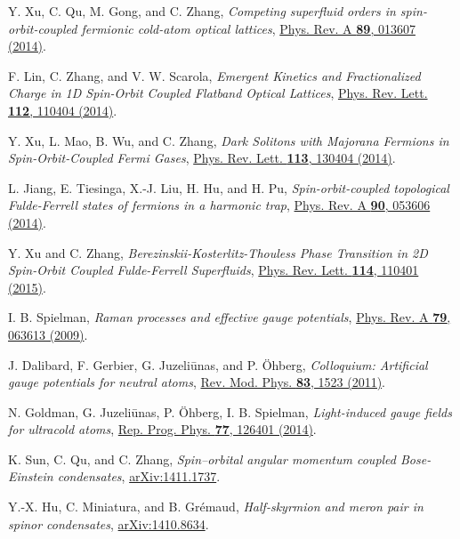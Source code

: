 \documentclass[twocolumn,pra,unsortedaddress,showpacs,floatfix,citeautoscript,nofootinbib]{revtex4-1}
\begin{document}
\begin{thebibliography}{99}
Y. Xu, C. Qu, M. Gong, and C. Zhang, \emph{Competing superfluid orders in spin-orbit-coupled fermionic cold-atom optical
lattices},
\href{http://dx.doi.org/10.1103/PhysRevA.89.013607}{Phys. Rev. A
\textbf{89}, 013607 (2014)}.

 F. Lin, C. Zhang, and V. W. Scarola, \emph{Emergent Kinetics and Fractionalized Charge in 1D Spin-Orbit Coupled Flatband Optical
Lattices},
\href{http://dx.doi.org/10.1103/PhysRevLett.112.110404}{Phys. Rev.
Lett. \textbf{112}, 110404 (2014)}.

Y. Xu, L. Mao, B. Wu, and C. Zhang, \emph{Dark Solitons with Majorana Fermions in Spin-Orbit-Coupled Fermi
Gases},
\href{http://dx.doi.org/10.1103/PhysRevLett.113.130404}{Phys. Rev.
Lett. \textbf{113}, 130404 (2014)}.

L. Jiang, E. Tiesinga, X.-J. Liu, H. Hu, and H.
Pu, \emph{Spin-orbit-coupled topological Fulde-Ferrell states of
fermions in a harmonic trap},
\href{http://dx.doi.org/10.1103/PhysRevA.90.053606}{Phys. Rev. A
\textbf{90}, 053606 (2014)}.

Y. Xu and C. Zhang, \emph{Berezinskii-Kosterlitz-Thouless Phase Transition in 2D Spin-Orbit Coupled Fulde-Ferrell
Superfluids},
\href{http://dx.doi.org/10.1103/PhysRevLett.114.110401}{Phys. Rev.
Lett. \textbf{114}, 110401 (2015)}.


 I. B. Spielman, \emph{Raman processes and effective gauge potentials}, \href{http://dx.doi.org/10.1103/PhysRevA.79.063613}%
{Phys. Rev. A \textbf{79}, 063613 (2009)}.

 J. Dalibard, F. Gerbier, G. Juzeli\={u}nas, and P.
\"{O}hberg, \emph{Colloquium: Artificial gauge potentials for
neutral atoms},
\href{http://dx.doi.org/10.1103/RevModPhys.83.1523}{Rev. Mod.
Phys. \textbf{83}, 1523 (2011)}.

 N. Goldman, G. Juzeli\={u}nas, P. \"{O}hberg, I. B.
Spielman, \emph{Light-induced gauge fields for ultracold atoms},
\href{http://dx.doi.org/10.1088/0034-4885/77/12/126401}{Rep. Prog.
Phys. \textbf{77}, 126401 (2014)}.


 K. Sun, C. Qu, and C. Zhang, \emph{Spin--orbital angular momentum coupled Bose-Einstein condensates}, \href{http://arxiv.org/abs/1411.1737}
{arXiv:1411.1737}.

 Y.-X. Hu, C. Miniatura, and B. Gr\'{e}maud, \emph{Half-skyrmion and meron pair in spinor condensates}, \href{http://arxiv.org/abs/1410.8634}
{arXiv:1410.8634}.


\end{thebibliography}
\end{document}
